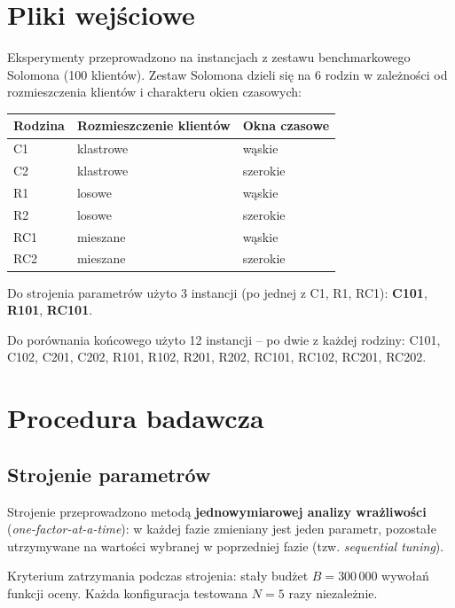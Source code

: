 \documentclass[11pt,a4paper]{article}
\begin{document}
\section{Pliki wejściowe}

Eksperymenty przeprowadzono na instancjach z zestawu benchmarkowego Solomona
(100 klientów). Zestaw Solomona dzieli się na 6 rodzin w zależności od rozmieszczenia
klientów i charakteru okien czasowych:

\begin{center}
\begin{tabular}{lll}
\toprule
Rodzina & Rozmieszczenie klientów & Okna czasowe \\
\midrule
C1 & klastrowe  & wąskie \\
C2 & klastrowe  & szerokie \\
R1 & losowe     & wąskie \\
R2 & losowe     & szerokie \\
RC1 & mieszane  & wąskie \\
RC2 & mieszane  & szerokie \\
\bottomrule
\end{tabular}
\end{center}

Do strojenia parametrów użyto 3 instancji (po jednej z C1, R1, RC1):
\textbf{C101}, \textbf{R101}, \textbf{RC101}.

Do porównania końcowego użyto 12 instancji -- po dwie z każdej rodziny:
C101, C102, C201, C202, R101, R102, R201, R202, RC101, RC102, RC201, RC202.

\section{Procedura badawcza}

\subsection{Strojenie parametrów}

Strojenie przeprowadzono metodą \textbf{jednowymiarowej analizy wrażliwości}
(\textit{one-factor-at-a-time}): w każdej fazie zmieniany jest jeden parametr,
pozostałe utrzymywane na wartości wybranej w poprzedniej fazie (tzw. \textit{sequential tuning}).

Kryterium zatrzymania podczas strojenia: stały budżet $B = 300\,000$ wywołań
funkcji oceny. Każda konfiguracja testowana $N=5$ razy niezależnie.
\end{document}
